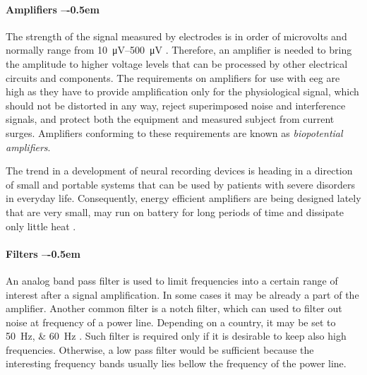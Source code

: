 \paragraph{Amplifiers --\kern-0.5em}
The strength of the signal measured by electrodes is in order of microvolts and
normally range from \SIrange{10}{500}{\uV} \cite{neuralAmp}. Therefore, an amplifier is needed to bring the amplitude to higher voltage levels that can be processed
by other electrical circuits and components. The requirements on amplifiers for
use with \gls{eeg} are high as they have to provide amplification only for the physiological
signal, which should not be distorted in any way, reject superimposed noise and
interference signals, and protect both the equipment and measured subject from
current surges. Amplifiers conforming to these requirements are known as
\emph{biopotential amplifiers}. \cite{biopotAmp}

The trend in a development of neural recording devices is heading in a direction of
small and portable systems that can be used by patients with severe disorders in everyday life.
Consequently, energy efficient amplifiers are being designed lately that are very small, may run on battery for
long periods of time and dissipate only little heat \cite{neuralAmp}.

\paragraph{Filters --\kern-0.5em}
An analog band pass filter is used to limit frequencies into a certain range of
interest after a signal amplification. In some cases it may be already a part of the amplifier.
Another common filter is a notch filter, which can used to filter out noise
at frequency of a power line. Depending on a country, it may be set to
\SIlist[list-units = single, list-pair-separator = { or }]{50;60}{\Hz}
\cite{deltaCompNREM}. Such filter is required only if it is desirable to keep also
high frequencies. Otherwise, a low pass filter would be sufficient because the interesting frequency bands usually lies bellow the frequency of the power line.

